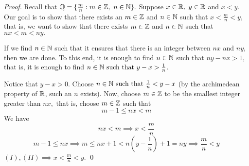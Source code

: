 \begin{proof}
    Recall that $\mathbb{Q} = \{\frac{m}{n} : m \in \mathbb{Z}, ~n \in \mathbb{N}\}.$ Suppose $x \in \mathbb{R}, ~y \in \mathbb{R}$ and $x < y.$ Our goal is to show that there exists an $m \in \mathbb{Z}$ and $n \in \mathbb{N}$ such that $x < \frac{m}{n} < y,$ that is, we want to show that there exists $m \in \mathbb{Z}$ and $n \in \mathbb{N}$ such that $nx < m < ny.$
    \begin{info}
        If we find $n\in \mathbb{N}$ such that it ensures that there is an integer between $nx$ and $ny$, then we are done. To this end, it is enough to find $n \in \mathbb{N}$ such that $ny - nx > 1,$ that is, it is enough to find $n \in \mathbb{N} \text{ such that } y - x > \frac{1}{n}$.
    \end{info}
    Notice that $y - x > 0.$ Choose $n \in \mathbb{N} \text{ such that } \frac{1}{n} < y - x$ (by the archimedean property of $\mathbb{R}$, such an $n$ exists). Now, choose $m\in \mathbb{Z}$ to be the smallest integer greater than $nx,$ that is, choose $m\in \mathbb{Z}$ such that 
    $$m-1 \leq nx < m$$
    We have
    \begin{equation*}
        nx < m \implies x < \frac{m}{n} \tag{$I$}
    \end{equation*}
    \begin{equation*}
        m-1 \leq nx \implies m \leq nx + 1 < n(y-\frac{1}{n}) + 1 = ny \implies \frac{m}{n} < y \tag{$II$}
    \end{equation*}
    $(I),(II) \implies x < \frac{m}{n} < y.$ \qed
\end{proof}